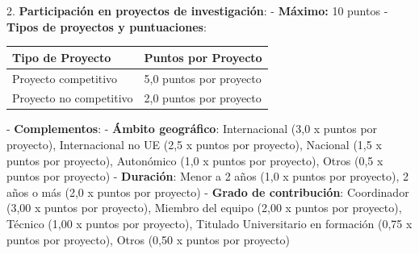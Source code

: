 \documentclass{article}
\begin{document}
\begin{itemize}
\begin{itemize}
                        2. \textbf{Participación en proyectos de investigación}:
                        - \textbf{Máximo:} 10 puntos
                        - \textbf{Tipos de proyectos y puntuaciones}:
                        \vspace{0.4cm}
                        \begin{table}[h!]\centering\renewcommand{\arraystretch}{1.3}
                              \begin{tabular}{|p{}|p{}|}\hline
                                    Tipo de Proyecto        & Puntos por Proyecto     \\\hline
                                    Proyecto competitivo    & 5,0 puntos por proyecto \\\hline
                                    Proyecto no competitivo & 2,0 puntos por proyecto \\\hline
                              \end{tabular}\end{table}
                        \vspace{0.4cm}
                        - \textbf{Complementos}:
                        - \textbf{Ámbito geográfico}: Internacional (3,0 x puntos por proyecto), Internacional no UE (2,5 x puntos por proyecto), Nacional (1,5 x puntos por proyecto), Autonómico (1,0 x puntos por proyecto), Otros (0,5 x puntos por proyecto)
                        - \textbf{Duración}: Menor a 2 años (1,0 x puntos por proyecto), 2 años o más (2,0 x puntos por proyecto)
                        - \textbf{Grado de contribución}: Coordinador (3,00 x puntos por proyecto), Miembro del equipo (2,00 x puntos por proyecto), Técnico (1,00 x puntos por proyecto), Titulado Universitario en formación (0,75 x puntos por proyecto), Otros (0,50 x puntos por proyecto)


\end{itemize}
\end{itemize}
\end{document}
